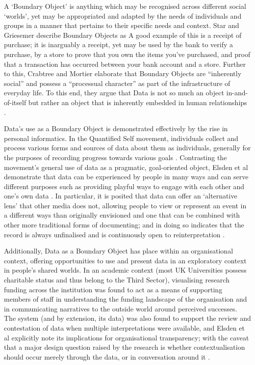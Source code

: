 A `Boundary Object' is anything which may be recognised across different social `worlds', yet may be appropriated and adapted by the needs of individuals and groups in a manner that pertains to their specific needs and context. Star and Griesemer describe Boundary Objects as  \cite{star_institutional_1989} A good example of this is a receipt of purchase; it is inarguably a receipt, yet may be used by the bank to verify a purchase, by a store to prove that you own the items you've purchased, and proof that a transaction has occurred between your bank account and a store. Further to this, Crabtree and Mortier elaborate that Boundary Objects are ``inherently social'' and possess a ``processual character'' as part of the infrastructure of everyday life. To this end, they argue that Data is not so much an object in-and-of-itself but rather an object that is inherently embedded in human relationships \cite{crabtree_human_2015}.

Data's use as a Boundary Object is demonstrated effectively by the rise in personal informatics. In the Quantified Self movement, individuals collect and process various forms and sources of data about them as individuals, generally for the purposes of recording progress towards various goals \cite{swan_emerging_2009, swan_quantified_2013}. Contrasting the movement's general use of data as a pragmatic, goal-oriented object, Elsden et al demonstrate that data can be experienced by people in many ways and can serve different purposes such as providing playful ways to engage with each other and one's own data \cite{elsden_quantified_2014, elsden_metadating:_2016}. In particular, it is posited that data can offer an `alternative lens' that other media does not, allowing people to view or represent an event in a different ways than originally envisioned and one that can be combined with other more traditional forms of documenting; and in doing so indicates that the record is always unfinalised and is continuously open to reinterpretation \cite{elsden_designing_2017}.

Additionally, Data as a Boundary Object has place within an organisational context, offering opportunities to use and present data in an exploratory context in people's shared worlds. In an academic context (most UK Universities possess charitable status and thus belong to the Third Sector), visualising research funding across the institution was found to act as a means of supporting members of staff in understanding the funding landscape of the organisation and in communicating narratives to the outside world around perceived successes. The system (and by extension, its data) was also found to support the review and contestation of data when multiple interpretations were available, and Elsden et al explicitly note its implications for organisational transparency; with the caveat that a major design question raised by the research is whether contextualisation should occur merely through the data, or in conversation around it \cite{elsden_resviz:_2016}.

